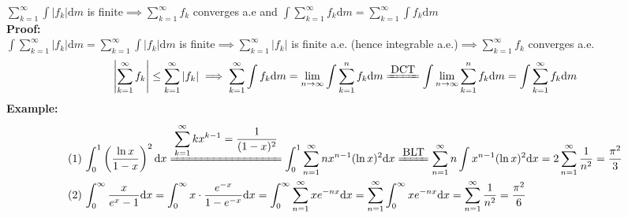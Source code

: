 \documentclass{article}
\newcommand{\sumkinf}{\displaystyle\sum_{k=1}^\infty}
\newcommand{\sumninf}{\displaystyle\sum_{n=1}^\infty}
\newcommand{\sumkn}{\displaystyle\sum_{k=1}^n}
\newcommand{\limninf}{\displaystyle\lim_{n\to\infty}}
\newcommand{\0}{{\bf{0}}}
\newcommand{\1}{{\bf{1}}}
\newcommand{\dint}{\displaystyle\int}
\newcommand{\dif}{\mbox{d}}
\begin{document}
$\sumkinf\dint|f_k|\dif m$ is finite$\implies\sumkinf f_k$ converges a.e and $\dint\sumkinf f_k\dif m=\sumkinf\dint f_k\dif m$\\
\textbf{Proof:}\\
$\dint\sumkinf|f_k|\dif m=\sumkinf\dint|f_k|\dif m$ is finite$\implies\sumkinf|f_k|$ is finite a.e. (hence integrable a.e.)$\implies\sumkinf f_k$ converges a.e.
$$\left|\sumkinf f_k\right|\le\sumkinf|f_k|\implies\sumkinf\dint f_k\dif m=\limninf\dint\sumkn f_k\dif m\xlongequal{\mbox{DCT}}\dint\limninf\sumkn f_k\dif m=\dint\sumkinf f_k\dif m$$
\textbf{Example:}
\begin{equation}
\begin{split}
    (1)\,&\int_0^1\left(\frac{\ln x}{1-x}\right)^2\dif x\xlongequal{\sumkinf kx^{k-1}=\frac{1}{(1-x)^2}}\dint_0^1\sumninf nx^{n-1}(\ln x)^2\dif x\xlongequal{\mbox{BLT}}\sumninf n\dint x^{n-1}(\ln x)^2\dif x=2\sumninf\frac{1}{n^2}=\frac{\pi^2}{3}\\
    (2)\,&\int_0^\infty\frac{x}{e^x-1}\dif x=\int_0^\infty x\cdot\frac{e^{-x}}{1-e^{-x}}\dif x=\int_0^\infty\sumninf xe^{-nx}\dif x=\sumninf\int_0^\infty xe^{-nx}\dif x=\sumninf\frac{1}{n^2}=\frac{\pi^2}{6}
\end{split}
\end{equation}
\end{document}
